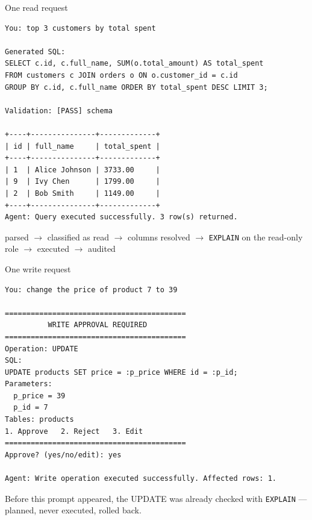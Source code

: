 \documentclass[aspectratio=169,10pt]{beamer}
\begin{document}
\begin{frame}[fragile]{One read request}
\begin{lstlisting}
You: top 3 customers by total spent

Generated SQL:
SELECT c.id, c.full_name, SUM(o.total_amount) AS total_spent
FROM customers c JOIN orders o ON o.customer_id = c.id
GROUP BY c.id, c.full_name ORDER BY total_spent DESC LIMIT 3;

Validation: [PASS] schema

+----+---------------+-------------+
| id | full_name     | total_spent |
+----+---------------+-------------+
| 1  | Alice Johnson | 3733.00     |
| 9  | Ivy Chen      | 1799.00     |
| 2  | Bob Smith     | 1149.00     |
+----+---------------+-------------+
Agent: Query executed successfully. 3 row(s) returned.
\end{lstlisting}
  {\footnotesize parsed $\rightarrow$ classified as read $\rightarrow$ columns resolved
  $\rightarrow$ \texttt{EXPLAIN} on the read-only role $\rightarrow$ executed $\rightarrow$ audited}
\end{frame}

\begin{frame}[fragile]{One write request}
\begin{lstlisting}
You: change the price of product 7 to 39

==========================================
          WRITE APPROVAL REQUIRED
==========================================
Operation: UPDATE
SQL:
UPDATE products SET price = :p_price WHERE id = :p_id;
Parameters:
  p_price = 39
  p_id = 7
Tables: products
1. Approve   2. Reject   3. Edit
==========================================
Approve? (yes/no/edit): yes

Agent: Write operation executed successfully. Affected rows: 1.
\end{lstlisting}
  \centering\footnotesize Before this prompt appeared, the UPDATE was already
  checked with \texttt{EXPLAIN} --- planned, never executed, rolled back.
\end{frame}
\end{document}
